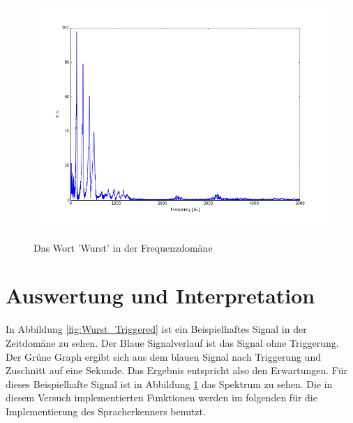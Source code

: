 \begin{figure}[H]
\includegraphics[width=\textwidth]{media/Wurst.png}
\label{fig:Wurst_Fourier}
\caption{Das Wort 'Wurst' in der Frequenzdomäne}
\end{figure}


\section{Auswertung und Interpretation}
\label{chap:VERSUCH_1_AUSWERTUNG}
In Abbildung \ref{fig:Wurst_Triggered} ist ein Beispielhaftes Signal in der Zeitdomäne zu sehen. Der Blaue Signalverlauf ist das Signal ohne Triggerung. Der Grüne Graph ergibt sich aus dem blauen Signal nach Triggerung und Zuschnitt auf eine Sekunde. Das Ergebnis entspricht also den Erwartungen. Für dieses Beispielhafte Signal ist in Abbildung \ref{fig:Wurst_Fourier} das Spektrum zu sehen. 
Die in diesem Versuch implementierten Funktionen werden im folgenden für die Implementierung des Spracherkenners benutzt.
